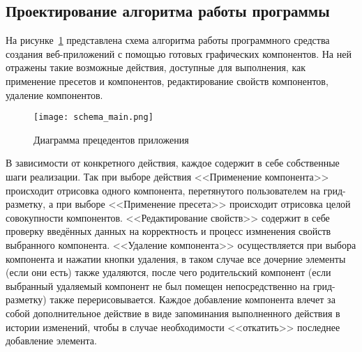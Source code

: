 \subsection{Проектирование алгоритма работы программы}
\label{sec:design:algorithm}

На рисунке~\ref{sec:design:main_algorithm_scheme} представлена схема алгоритма работы программного средства создания веб-приложений с помощью готовых графических компонентов. 
На ней отражены такие возможные действия, доступные для выполнения, как применение пресетов и компонентов, редактирование свойств компонентов, удаление компонентов. 

\begin{figure}[ht]
\centering
    \texttt{[image: schema\_main.png]}
    \caption{Диаграмма прецедентов приложения}
    \label{sec:design:main_algorithm_scheme}
\end{figure}
    
В зависимости от конкретного действия, каждое содержит в себе собственные шаги реализации. 
Так при выборе действия <<Применение компонента>> происходит отрисовка одного компонента, перетянутого пользователем на грид-разметку, а при выборе <<Применение пресета>> происходит отрисовка целой совокупности компонентов. <<Редактирование свойств>> содержит в себе проверку введённых данных на корректность и процесс измненения свойств выбранного компонента. <<Удаление компонента>> осуществляется при выбора компонента и нажатии кнопки удаления, в таком случае все дочерние элементы (если они есть) также удаляются, после чего родительский компонент (если выбранный удаляемый компонент не был помещен непосредственно на грид-разметку) также перерисовывается. Каждое добавление компонента влечет за собой дополнительное действие в виде запоминания выполненного действия в истории изменений, чтобы в случае необходимости <<откатить>> последнее добавление элемента.

